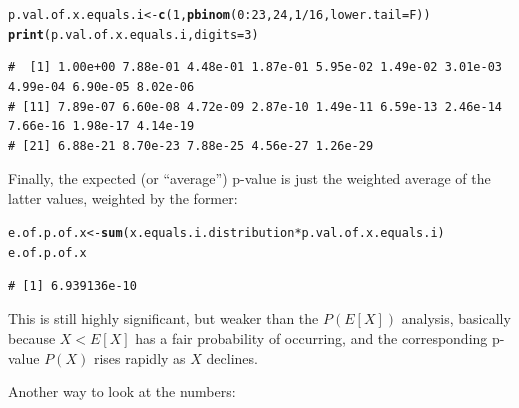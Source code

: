 \documentclass{article}\usepackage[]{graphicx}\usepackage[]{color}
\makeatletter
\newcommand{\hlnum}[1]{\textcolor[rgb]{0.686,0.059,0.569}{#1}}%
\newcommand{\hlopt}[1]{\textcolor[rgb]{0,0,0}{#1}}%
\newcommand{\hlstd}[1]{\textcolor[rgb]{0.345,0.345,0.345}{#1}}%
\newcommand{\hlkwb}[1]{\textcolor[rgb]{0.69,0.353,0.396}{#1}}%
\newcommand{\hlkwc}[1]{\textcolor[rgb]{0.333,0.667,0.333}{#1}}%
\newcommand{\hlkwd}[1]{\textcolor[rgb]{0.737,0.353,0.396}{\textbf{#1}}}%
\newenvironment{kframe}{%
 \def\at@end@of@kframe{}%
 \ifinner\ifhmode%
  \def\at@end@of@kframe{\end{minipage}}%
  \begin{minipage}{\columnwidth}%
 \fi\fi%
 \def\FrameCommand##1{\hskip\@totalleftmargin \hskip-\fboxsep
 \colorbox{shadecolor}{##1}\hskip-\fboxsep
     \hskip-\linewidth \hskip-\@totalleftmargin \hskip\columnwidth}%
 \MakeFramed {\advance\hsize-\width
   \@totalleftmargin\z@ \linewidth\hsize
   \@setminipage}}%
 {\par\unskip\endMakeFramed%
 \at@end@of@kframe}
\newenvironment{knitrout}{}{} %
\makeatother
\begin{document}
\begin{enumerate}
\begin{knitrout}\footnotesize
{}\color{fgcolor}\begin{kframe}
\begin{alltt}
\hlstd{p.val.of.x.equals.i} \hlkwb{<-} \hlkwd{c}\hlstd{(}\hlnum{1}\hlstd{,} \hlkwd{pbinom}\hlstd{(}\hlnum{0}\hlopt{:}\hlnum{23}\hlstd{,} \hlnum{24}\hlstd{,} \hlnum{1}\hlopt{/}\hlnum{16}\hlstd{,} \hlkwc{lower.tail} \hlstd{= F))}
\hlkwd{print}\hlstd{(p.val.of.x.equals.i,} \hlkwc{digits}\hlstd{=}\hlnum{3}\hlstd{)}
\end{alltt}
\begin{verbatim}
#  [1] 1.00e+00 7.88e-01 4.48e-01 1.87e-01 5.95e-02 1.49e-02 3.01e-03 4.99e-04 6.90e-05 8.02e-06
# [11] 7.89e-07 6.60e-08 4.72e-09 2.87e-10 1.49e-11 6.59e-13 2.46e-14 7.66e-16 1.98e-17 4.14e-19
# [21] 6.88e-21 8.70e-23 7.88e-25 4.56e-27 1.26e-29
\end{verbatim}
\end{kframe}
\end{knitrout}

Finally, the expected (or ``average'') p-value is just the weighted average of the latter values, weighted by the former:

\begin{knitrout}\footnotesize
{}\color{fgcolor}\begin{kframe}
\begin{alltt}
\hlstd{e.of.p.of.x} \hlkwb{<-} \hlkwd{sum}\hlstd{(x.equals.i.distribution} \hlopt{*} \hlstd{p.val.of.x.equals.i)}
\hlstd{e.of.p.of.x}
\end{alltt}
\begin{verbatim}
# [1] 6.939136e-10
\end{verbatim}
\end{kframe}
\end{knitrout}

This is still highly significant, but weaker than the $P(E[X])$ analysis, basically because $X<E[X]$ has a fair probability of occurring, and the corresponding p-value $P(X)$ rises rapidly as $X$ declines.

Another way to look at the numbers:


\end{enumerate}
\end{document}
